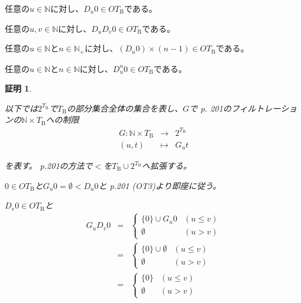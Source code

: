 \documentclass[dvipdfmx,uplatex]{jsarticle}
\theoremstyle{customnonumberbreakfortheorem}
\theoremstyle{customnonumberbreakforproof}
\newtheorem{hideableproof}{証明}
\begin{document}
\begin{lemma}[順序数項の基本例]\label{順序数項の基本例}
	\begin{penumerate}
		\item 任意の\(u \in \mathbb{N}\)に対し、\(D_u 0 \in OT_{\textrm{B}}\)である。
		\item 任意の\(u,v \in \mathbb{N}\)に対し、\(D_u D_v 0 \in OT_{\textrm{B}}\)である。
		\item 任意の\(u \in \mathbb{N}\)と\(n \in \mathbb{N}_{+}\)に対し、\((D_u 0) \times (n-1) \in OT_{\textrm{B}}\)である。
		\item 任意の\(u \in \mathbb{N}\)と\(n \in \mathbb{N}\)に対し、\(D_u^n 0 \in OT_{\textrm{B}}\)である。
	\end{penumerate}
\end{lemma}

\begin{hideableproof}
	\begin{penumerate}
		\item[] 以下では\(2^{T_{\textrm{B}}}\)で\(T_{\textrm{B}}\)の部分集合全体の集合を表し、\(G\)で\cite{buc1} p. 201のフィルトレーションの\(\mathbb{N} \times T_{\textrm{B}}\)への制限
		\begin{eqnarray*}
		G \colon \mathbb{N} \times T_{\textrm{B}} & \to & 2^{T_{\textrm{B}}} \\
		(u,t) & \mapsto & G_u t
		\end{eqnarray*}
		\item[] を表す。\cite{buc1} p.201の方法で\(<\)を\(T_{\textrm{B}} \cup 2^{T_{\textrm{B}}}\)へ拡張する。
		\item[]
		\item \(0 \in OT_{\textrm{B}}\)と\(G_u 0 = \emptyset < D_u 0\)と\cite{buc1} p.201 (OT3)より即座に従う。
		\item \(D_v 0 \in OT_{\textrm{B}}\)と
		\begin{eqnarray*}
		G_u D_v 0 & = & \left\{ \begin{array}{ll} \{0\} \cup G_u 0 & (u \leq v) \\ \emptyset & (u > v) \end{array} \right. \\
		& = & \left\{ \begin{array}{ll} \{0\} \cup \emptyset & (u \leq v) \\ \emptyset & (u > v) \end{array} \right. \\
		& = & \left\{ \begin{array}{ll} \{0\} & (u \leq v) \\ \emptyset & (u > v) \end{array} \right. \\

\end{eqnarray*}
\end{penumerate}
\end{hideableproof}
\end{document}
